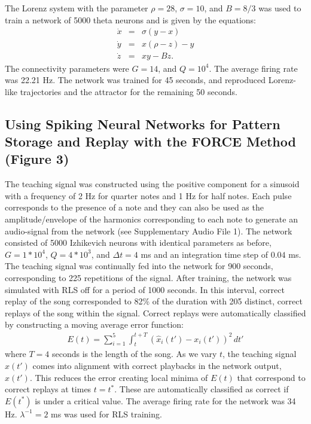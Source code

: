 \documentclass[11pt]{article} %
\begin{document}
The Lorenz system with the parameter $\rho = 28$, $\sigma = 10$, and $B=8/3$ was used to train a network of 5000 theta neurons and is given by the equations:
\begin{eqnarray*}
\dot{x} &=& \sigma(y-x)\\
\dot{y} &=& x(\rho - z) -y \\
\dot{z} &=& xy -B z.
\end{eqnarray*}
The connectivity parameters were $G=14$, and $Q=10^4$.  The average firing rate was 22.21 Hz.  The network was trained for 45 seconds, and reproduced Lorenz-like trajectories and the attractor for the remaining 50 seconds. 




\subsection*{Using Spiking Neural Networks for Pattern Storage and Replay with the FORCE Method (Figure 3)}

The teaching signal was constructed using the positive component for a sinusoid with a frequency of 2 Hz for quarter notes and 1 Hz for half notes.  Each pulse corresponds to the presence of a note and they can also be used as the amplitude/envelope of the harmonics corresponding to each note to generate an audio-signal from the network (see Supplementary Audio File 1).  The network consisted of 5000 Izhikevich neurons with identical parameters as before, $G=1*10^4$, $Q = 4*10^3$, and $\Delta t = 4$ ms and an integration time step of $0.04$ ms.  The teaching signal was continually fed into the network for 900 seconds, corresponding to 225 repetitions of the signal.  After training, the network was simulated with RLS off for a period of 1000 seconds.  In this interval, correct replay of the song corresponded to 82\% of the duration with 205 distinct, correct replays of the song within the signal.   Correct replays were automatically classified by constructing a moving average error function:
\begin{eqnarray}
E(t) = \sum_{i=1}^5\int_{t}^{t+T}(\hat{x}_i(t')-x_i(t'))^2\,dt' 
\end{eqnarray} 
where $T=4$ seconds is the length of the song.  As we vary $t$, the teaching signal $x(t')$ comes into alignment with correct playbacks in the network output, $\hat{x}(t')$.  This reduces the error creating local minima of $E(t)$ that correspond to correct replays at times $t=t^*$.  These are automatically classified as correct if $E(t^*)$ is under a critical value.   The average firing rate for the network was 34 Hz.   $\lambda^{-1} =2$ ms was used for RLS training.
\end{document}
